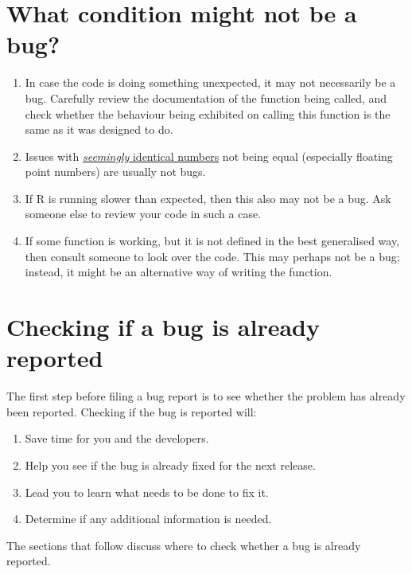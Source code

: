\documentclass[
  letterpaper,
  DIV=11,
  numbers=noendperiod]{scrreprt}
\begin{document}
\section{What condition might not be a
bug?}\label{what-condition-might-not-be-a-bug}

\begin{enumerate}
\def\labelenumi{\arabic{enumi}.}
\item
  In case the code is doing something unexpected, it may not necessarily
  be a bug. Carefully review the documentation of the function being
  called, and check whether the behaviour being exhibited on calling
  this function is the same as it was designed to do.
\item
  Issues with
  \href{https://cran.r-project.org/doc/FAQ/R-FAQ.html\#Why-doesn_0027t-R-think-these-numbers-are-equal_003f}{\emph{seemingly}
  identical numbers} not being equal (especially floating point numbers)
  are usually not bugs.
\item
  If R is running slower than expected, then this also may not be a bug.
  Ask someone else to review your code in such a case.
\item
  If some function is working, but it is not defined in the best
  generalised way, then consult someone to look over the code. This may
  perhaps not be a bug; instead, it might be an alternative way of
  writing the function.
\end{enumerate}

\section{Checking if a bug is already
reported}\label{already-reported-bugs}

The first step before filing a bug report is to see whether the problem
has already been reported. Checking if the bug is reported will:

\begin{enumerate}
\def\labelenumi{\arabic{enumi}.}
\item
  Save time for you and the developers.
\item
  Help you see if the bug is already fixed for the next release.
\item
  Lead you to learn what needs to be done to fix it.
\item
  Determine if any additional information is needed.
\end{enumerate}

The sections that follow discuss where to check whether a bug is already
reported.
\end{document}
